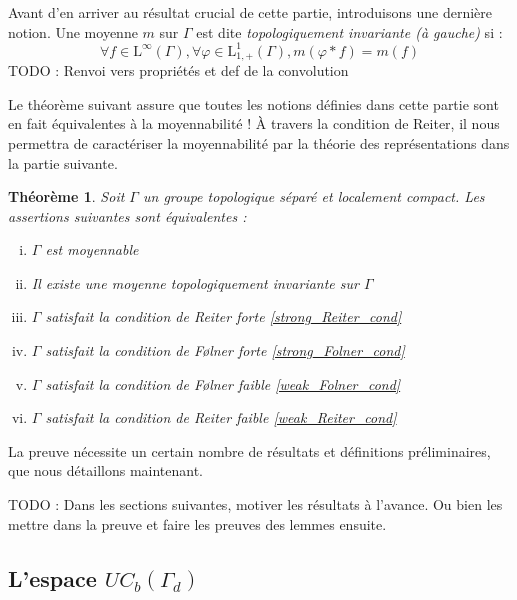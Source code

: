 \documentclass[a4paper,12pt]{article}
\newtheorem{theorem}{Théorème}[section]
\newcommand{\TODO}[1]{{\color{red}TODO :} #1}
\begin{document}
Avant d'en arriver au résultat crucial de cette partie, introduisons une dernière notion. Une moyenne $m$ sur $\Gamma$ est dite 
\emph{topologiquement invariante (à gauche)} si :
\begin{equation*}
    \forall f\in\mathrm{L}^\infty(\Gamma), \forall\varphi\in\mathrm{L}^1_{1, +}(\Gamma), m(\varphi*f) = m(f)
\end{equation*}
\TODO{Renvoi vers propriétés et def de la convolution}

Le théorème suivant assure que toutes les notions définies dans cette partie sont en fait équivalentes à la moyennabilité ! À travers la condition de Reiter, il nous 
permettra de caractériser la moyennabilité par la théorie des représentations dans la partie suivante.

\begin{theorem}\label{amenable_TFAE}
    Soit $\Gamma$ un groupe topologique séparé et localement compact. Les assertions suivantes sont équivalentes :
    \begin{enumerate}[(i)]
        \item $\Gamma$ est moyennable \label{amenable_TFAE/amenable}
        \item Il existe une moyenne topologiquement invariante sur $\Gamma$ \label{amenable_TFAE/topological_mean}
        \item $\Gamma$ satisfait la condition de Reiter forte \label{amenable_TFAE/strong_Reiter} \eqref{strong_Reiter_cond}
        \item $\Gamma$ satisfait la condition de F\o{}lner forte \label{amenable_TFAE/strong_Folner} \eqref{strong_Folner_cond}
        \item $\Gamma$ satisfait la condition de F\o{}lner faible \label{amenable_TFAE/weak_Folner} \eqref{weak_Folner_cond}
        \item $\Gamma$ satisfait la condition de Reiter faible \label{amenable_TFAE/weak_Reiter} \eqref{weak_Reiter_cond}
    \end{enumerate}
\end{theorem}

La preuve nécessite un certain nombre de résultats et définitions préliminaires, que nous détaillons maintenant. 

\TODO{Dans les sections suivantes, motiver les résultats à l'avance. Ou bien les mettre dans la preuve et faire les preuves des lemmes ensuite.}

\subsection{L'espace \texorpdfstring{$UC_b(\Gamma_d)$}{des fonctions uniformément continues bornées}}
\end{document}
